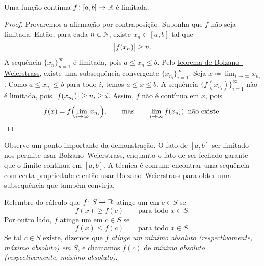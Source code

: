 \begin{lemma}
Uma função contínua $f \colon [a,b] \to \R$ é limitada.
\end{lemma}

\begin{proof}
Provaremos a afirmação por contraposição. Suponha que $f$ não seja limitada.
Então, para cada
$n \in {\mathbb{N}}$, existe $x_n \in [a,b]$ tal que
\begin{equation*}
\bigl\lvert {f(x_n)} \bigr\rvert \geq n .
\end{equation*}
A sequência $\{ x_n \}_{n=1}^\infty$ é limitada, pois $a \leq x_n \leq b$.
Pelo \hyperref[thm:bwseq]{teorema de Bolzano--Weierstrass},
existe uma subsequência convergente $\{ x_{n_i} \}_{i=1}^\infty$.
Seja $x \coloneqq \lim_{i\to\infty} x_{n_i}$.
Como $a \leq x_{n_i} \leq b$ para todo $i$, temos $a \leq x \leq b$.
A sequência $\bigl\{ f(x_{n_i}) \bigr\}_{i=1}^\infty$ não é limitada,
pois
$\bigl\lvert {f(x_{n_i})} \bigr\rvert \geq n_i \geq i$.
Assim, $f$ não é contínua em $x$, pois
\begin{equation*}
f(x)
=
f\Bigl( \lim_{i\to\infty} x_{n_i} \Bigr) ,
\qquad \text{mas} \qquad
\lim_{i\to\infty} f(x_{n_i}) \enspace \text{não existe.} \qedhere
\end{equation*}
\end{proof}

Observe um ponto importante da demonstração.
O fato de $[a,b]$ ser limitado nos permite usar Bolzano--Weierstrass,
enquanto o fato de ser fechado garante que o limite continua em $[a,b]$.
A técnica é comum: encontrar uma sequência com certa propriedade
e então usar Bolzano--Weierstrass para obter uma subsequência que também convirja.

Relembre do cálculo que $f \colon S \to {\mathbb{R}}$ atinge um
\emph{}%
em $c \in S$ se
\begin{equation*}
f(x) \geq f(c) \qquad \text{para todo } x \in S.
\end{equation*}
Por outro lado, $f$ atinge um
\emph{}%
em $c \in S$ se
\begin{equation*}
f(x) \leq f(c) \qquad \text{para todo } x \in S.
\end{equation*}
Se tal $c \in S$ existe, dizemos que
$f$ \emph{atinge um mínimo absoluto (respectivamente, máximo absoluto) em
$S$}, e chamamos
$f(c)$ de \emph{mínimo absoluto (respectivamente, máximo absoluto)}.
\begin{myfigureht}
\caption{$f \colon [a,b] \to \R$ atinge um máximo absoluto $f(c)$ em
$c$ e um mínimo absoluto $f(d)$ em $d$.\label{fig:minmax}}
\end{myfigureht}

